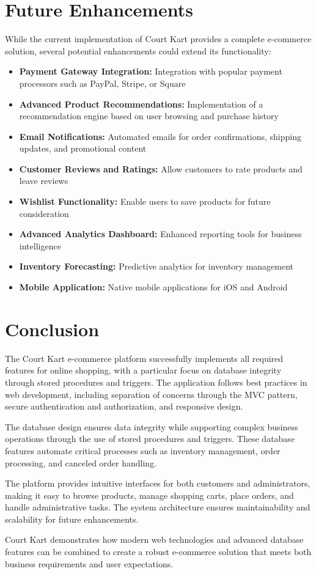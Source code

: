 \documentclass[14pt,a4paper]{article}
\begin{document}
\section{Future Enhancements}

While the current implementation of Court Kart provides a complete e-commerce solution, several potential enhancements could extend its functionality:

\begin{itemize}
	\item \textbf{Payment Gateway Integration:} Integration with popular payment processors such as PayPal, Stripe, or Square
	\item \textbf{Advanced Product Recommendations:} Implementation of a recommendation engine based on user browsing and purchase history
	\item \textbf{Email Notifications:} Automated emails for order confirmations, shipping updates, and promotional content
	\item \textbf{Customer Reviews and Ratings:} Allow customers to rate products and leave reviews
	\item \textbf{Wishlist Functionality:} Enable users to save products for future consideration
	\item \textbf{Advanced Analytics Dashboard:} Enhanced reporting tools for business intelligence
	\item \textbf{Inventory Forecasting:} Predictive analytics for inventory management
	\item \textbf{Mobile Application:} Native mobile applications for iOS and Android
\end{itemize}

\section{Conclusion}

The Court Kart e-commerce platform successfully implements all required features for online shopping, with a particular focus on database integrity through stored procedures and triggers. The application follows best practices in web development, including separation of concerns through the MVC pattern, secure authentication and authorization, and responsive design.

The database design ensures data integrity while supporting complex business operations through the use of stored procedures and triggers. These database features automate critical processes such as inventory management, order processing, and canceled order handling.

The platform provides intuitive interfaces for both customers and administrators, making it easy to browse products, manage shopping carts, place orders, and handle administrative tasks. The system architecture ensures maintainability and scalability for future enhancements.

\begin{infobox}
	Court Kart demonstrates how modern web technologies and advanced database features can be combined to create a robust e-commerce solution that meets both business requirements and user expectations.
\end{infobox}
\end{document}
